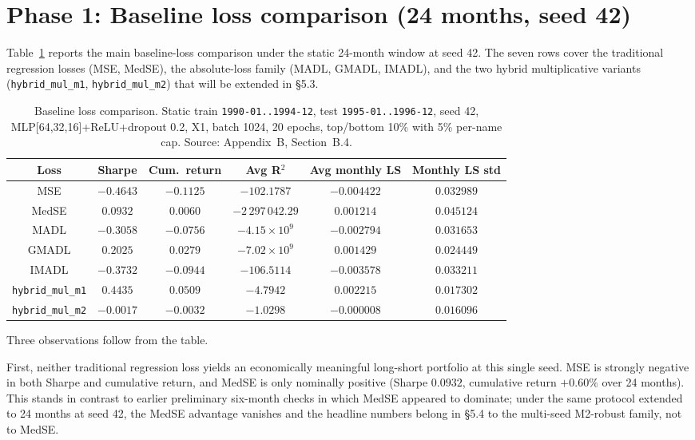 \section{Phase 1: Baseline loss comparison (24 months, seed 42)}

\label{sec:phase1-baseline-loss-comparison}

Table~\ref{tab:baseline-loss-comparison} reports the main baseline-loss comparison under the static 24-month window at seed 42. The seven rows cover the traditional regression losses (MSE, MedSE), the absolute-loss family (MADL, GMADL, IMADL), and the two hybrid multiplicative variants (\texttt{hybrid\_mul\_m1}, \texttt{hybrid\_mul\_m2}) that will be extended in \S5.3.

\begin{table}[H]
\centering
\caption{Baseline loss comparison. Static train \texttt{1990-01..1994-12}, test \texttt{1995-01..1996-12}, seed 42, MLP[64,32,16]+ReLU+dropout 0.2, X1, batch 1024, 20 epochs, top/bottom 10\% with 5\% per-name cap. Source: Appendix~B, Section~B.4.}
\label{tab:baseline-loss-comparison}
\begin{tabular}{cccccc}
\toprule
Loss & Sharpe & Cum.\ return & Avg R$^2$ & Avg monthly LS & Monthly LS std \\
\midrule
MSE & $-0.4643$ & $-0.1125$ & $-102.1787$ & $-0.004422$ & $0.032989$ \\
MedSE & $0.0932$ & $0.0060$ & $-2\,297\,042.29$ & $0.001214$ & $0.045124$ \\
MADL & $-0.3058$ & $-0.0756$ & $-4.15 \times 10^{9}$ & $-0.002794$ & $0.031653$ \\
GMADL & $0.2025$ & $0.0279$ & $-7.02 \times 10^{9}$ & $0.001429$ & $0.024449$ \\
IMADL & $-0.3732$ & $-0.0944$ & $-106.5114$ & $-0.003578$ & $0.033211$ \\
\texttt{hybrid\_mul\_m1} & $0.4435$ & $0.0509$ & $-4.7942$ & $0.002215$ & $0.017302$ \\
\texttt{hybrid\_mul\_m2} & $-0.0017$ & $-0.0032$ & $-1.0298$ & $-0.000008$ & $0.016096$ \\
\bottomrule
\end{tabular}
\end{table}

Three observations follow from the table.

First, neither traditional regression loss yields an economically meaningful long-short portfolio at this single seed. MSE is strongly negative in both Sharpe and cumulative return, and MedSE is only nominally positive (Sharpe $0.0932$, cumulative return $+0.60\%$ over 24 months). This stands in contrast to earlier preliminary six-month checks in which MedSE appeared to dominate; under the same protocol extended to 24 months at seed 42, the MedSE advantage vanishes and the headline numbers belong in \S5.4 to the multi-seed M2-robust family, not to MedSE.


